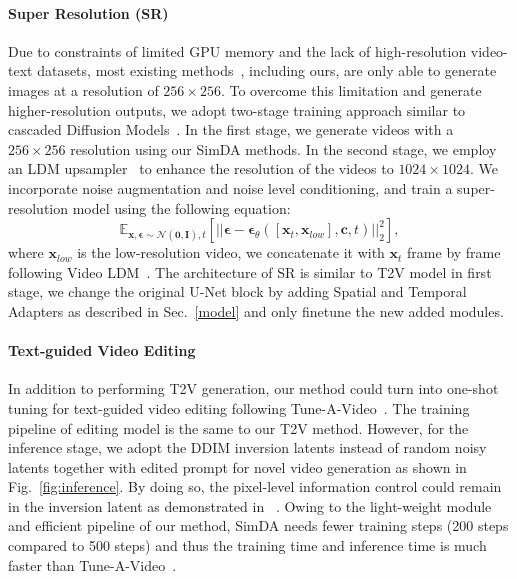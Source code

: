 \paragraph{Super Resolution (SR)} Due to constraints of limited GPU memory and the lack of high-resolution video-text datasets, most existing methods~\cite{lvdm, videoLDM, latentshift}, including ours, are only able to generate images at a resolution of $256\times256$. To overcome this limitation and generate higher-resolution outputs, we adopt two-stage training approach similar to cascaded Diffusion Models~\cite{cascaded}. In the first stage, we generate videos with a  $256\times 256$ resolution using our SimDA methods. In the second stage, we employ an LDM upsampler~\cite{stablediffusion} to enhance the resolution of the videos to $1024\times1024$. We incorporate noise augmentation and noise level conditioning, and train a super-resolution model using the following equation:
\begin{equation}
\mathbb{E}_{\bm{x},\bm{\epsilon} \sim \mathcal{N}(\bm{0},\mathbf{I}),t}[\lvert\lvert \bm{\epsilon} - \bm{\epsilon}_\theta([\bm{x}_t,\bm{x}_{low}],\bm{c},t)\rvert\rvert^2_2],
\end{equation}
where $\bm{x}_{low}$ is the low-resolution video, we concatenate it with $\bm{x}_t$ frame by frame following Video LDM~\cite{videoLDM}. The architecture of SR is similar to T2V model in first stage, we change the original U-Net block by adding Spatial and Temporal Adapters as described in Sec.~\ref{model} and only finetune the new added modules.

\paragraph{Text-guided Video Editing} In addition to performing T2V generation, our method could turn into one-shot tuning for text-guided video editing following Tune-A-Video~\cite{tuneavideo}. The training pipeline of editing model is the same to our T2V method. However, for the inference stage, we adopt the DDIM inversion latents instead of random noisy latents together with edited prompt for novel video generation as shown in Fig.~\ref{fig:inference}. By doing so, the pixel-level information control could remain in the inversion latent as demonstrated in ~\cite{tuneavideo}. Owing to the light-weight module and efficient pipeline of our method, SimDA needs fewer training steps (200 steps compared to 500 steps) and thus the training time and inference time is much faster than Tune-A-Video~\cite{tuneavideo}.
 

